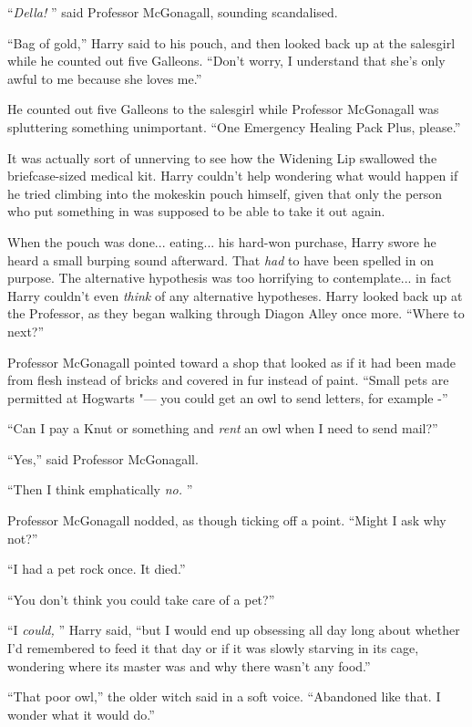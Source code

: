 ``\emph{Della!} '' said Professor McGonagall, sounding scandalised.

``Bag of gold,'' Harry said to his pouch, and then looked back up at the
salesgirl while he counted out five Galleons. ``Don't worry, I
understand that she's only awful to me because she loves me.''

He counted out five Galleons to the salesgirl while Professor McGonagall
was spluttering something unimportant. ``One Emergency Healing Pack
Plus, please.''

It was actually sort of unnerving to see how the Widening Lip swallowed
the briefcase-sized medical kit. Harry couldn't help wondering what
would happen if he tried climbing into the mokeskin pouch himself, given
that only the person who put something in was supposed to be able to
take it out again.

When the pouch was done... eating... his hard-won purchase,
Harry swore he heard a small burping sound afterward. That \emph{had} to
have been spelled in on purpose. The alternative hypothesis was too
horrifying to contemplate... in fact Harry couldn't even
\emph{think} of any alternative hypotheses. Harry looked back up at the
Professor, as they began walking through Diagon Alley once more. ``Where
to next?''

Professor McGonagall pointed toward a shop that looked as if it had been
made from flesh instead of bricks and covered in fur instead of paint.
``Small pets are permitted at Hogwarts "--- you could get an owl to send
letters, for example -''

``Can I pay a Knut or something and \emph{rent} an owl when I need to
send mail?''

``Yes,'' said Professor McGonagall.

``Then I think emphatically \emph{no.} ''

Professor McGonagall nodded, as though ticking off a point. ``Might I
ask why not?''

``I had a pet rock once. It died.''

``You don't think you could take care of a pet?''

``I \emph{could,} '' Harry said, ``but I would end up obsessing all day
long about whether I'd remembered to feed it that day or if it was
slowly starving in its cage, wondering where its master was and why
there wasn't any food.''

``That poor owl,'' the older witch said in a soft voice. ``Abandoned
like that. I wonder what it would do.''

